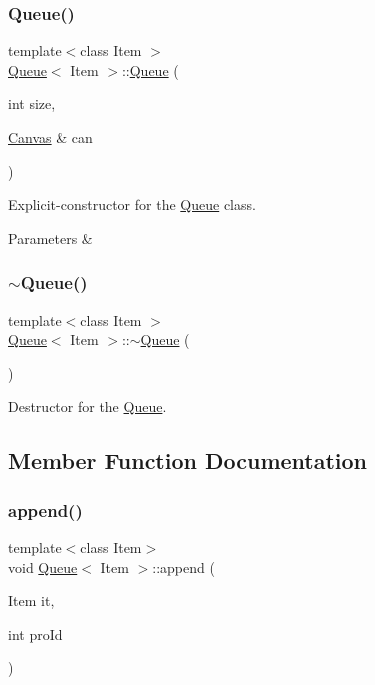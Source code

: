 \subsubsection{\texorpdfstring{Queue()}{Queue()}\hspace{0.1cm}{\footnotesize\ttfamily [2/2]}}
{\footnotesize\ttfamily template$<$class Item $>$ \\
\hyperlink{class_queue}{Queue}$<$ Item $>$\+::\hyperlink{class_queue}{Queue} (\begin{DoxyParamCaption}\item[{int}]{size,  }\item[{\hyperlink{classtsgl_1_1_canvas}{Canvas} \&}]{can }\end{DoxyParamCaption})}

Explicit-\/constructor for the \hyperlink{class_queue}{Queue} class. 
\begin{DoxyParams}{Parameters}
{\em } & \\
\hline
\end{DoxyParams}
\mbox{\label{class_queue_abf6556b17de62227759af86ac8352765}} 
\subsubsection{\texorpdfstring{$\sim$\+Queue()}{~Queue()}}
{\footnotesize\ttfamily template$<$class Item $>$ \\
\hyperlink{class_queue}{Queue}$<$ Item $>$\+::$\sim$\hyperlink{class_queue}{Queue} (\begin{DoxyParamCaption}{ }\end{DoxyParamCaption})}

Destructor for the \hyperlink{class_queue}{Queue}. 

\subsection{Member Function Documentation}
\mbox{\label{class_queue_af529bb8ea595f04a4e001235d9fa9500}} 
\subsubsection{\texorpdfstring{append()}{append()}}
{\footnotesize\ttfamily template$<$class Item$>$ \\
void \hyperlink{class_queue}{Queue}$<$ Item $>$\+::append (\begin{DoxyParamCaption}\item[{Item}]{it,  }\item[{int}]{pro\+Id }\end{DoxyParamCaption})}

